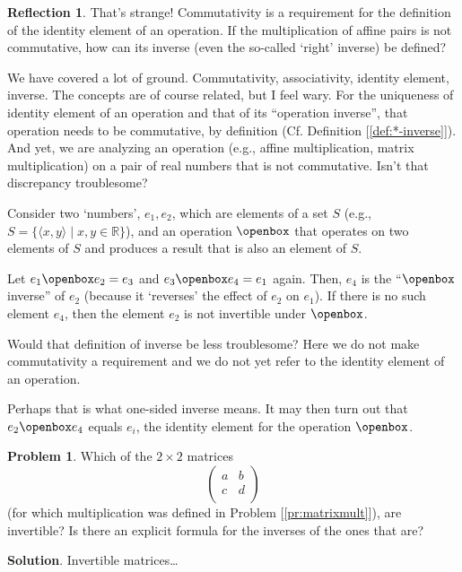 \documentclass[english,notitlepage,smartquotes]{hgbreport}
\theoremstyle{definition}
\theoremstyle{definition}
\newtheorem{problem}{Problem}
\theoremstyle{remark}
\theoremstyle{definition}
\theoremstyle{plain}
\theoremstyle{definition}
\newtheorem{reflection}{Reflection}
\begin{document}
\begin{reflection}
That's strange! Commutativity is a requirement for the definition of the identity element of an operation. If the multiplication of affine pairs is not commutative, how can its inverse (even the so-called `right' inverse) be defined?

We have covered a lot of ground. Commutativity, associativity, identity element, inverse. The concepts are of course related, but I feel wary. For the uniqueness of identity element of an operation and that of its ``operation inverse'', that operation needs to be commutative, by definition (Cf. Definition [\ref{def:*-inverse}]). And yet, we are analyzing an operation (e.g., affine multiplication, matrix multiplication) on a pair of real numbers that is not commutative. Isn't that discrepancy troublesome?  

Consider two `numbers', $e_1,e_2$, which are elements of a set $S$ (e.g., $S=\{\langle x,y\rangle\mid x,y\in\mathbb{R}\}$), and an operation $\openbox$ that operates on two elements of $S$ and produces a result that is also an element of $S$. 

Let $e_1\openbox e_2=e_3$ and $e_3\openbox e_4=e_1$ again. Then, $e_4$ is the ``$\openbox$ inverse'' of $e_2$ (because it `reverses' the effect of $e_2$ on $e_1$). If there is no such element $e_4$, then the element $e_2$ is not invertible under $\openbox$.

Would that definition of inverse be less troublesome? Here we do not make commutativity a requirement and we do not yet refer to the identity element of an operation.

Perhaps that is what one-sided inverse means. It may then turn out that $e_2\openbox e_4$ equals $e_i$, the identity element for the operation $\openbox$.
\end{reflection}

\begin{problem}
\label{pr:matrixinv}
Which of the $2\times2$ matrices 
$$
  \begin{pmatrix}
    a & b\\
    c & d\\
  \end{pmatrix}
$$
(for which multiplication was defined in Problem [\ref{pr:matrixmult}]), are invertible? Is there an explicit formula for the inverses of the ones that are?
\end{problem}

\textbf{Solution}.
Invertible matrices\dots{}
\end{document}
